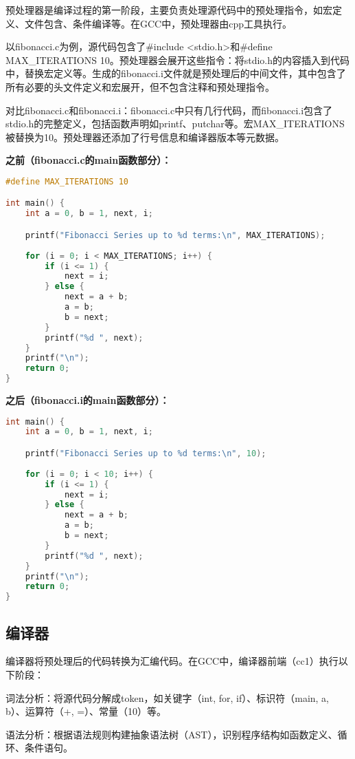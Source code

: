 \documentclass[a4paper]{article}
\begin{document}
预处理器是编译过程的第一阶段，主要负责处理源代码中的预处理指令，如宏定义、文件包含、条件编译等。在GCC中，预处理器由cpp工具执行。

以fibonacci.c为例，源代码包含了\#include <stdio.h>和\#define MAX\_ITERATIONS 10。预处理器会展开这些指令：将stdio.h的内容插入到代码中，替换宏定义等。生成的fibonacci.i文件就是预处理后的中间文件，其中包含了所有必要的头文件定义和宏展开，但不包含注释和预处理指令。

对比fibonacci.c和fibonacci.i：fibonacci.c中只有几行代码，而fibonacci.i包含了stdio.h的完整定义，包括函数声明如printf、putchar等。宏MAX\_ITERATIONS被替换为10。预处理器还添加了行号信息和编译器版本等元数据。

\textbf{之前（fibonacci.c的main函数部分）：}
\begin{lstlisting}[language=C]
#define MAX_ITERATIONS 10

int main() {
    int a = 0, b = 1, next, i;

    printf("Fibonacci Series up to %d terms:\n", MAX_ITERATIONS);
    
    for (i = 0; i < MAX_ITERATIONS; i++) {
        if (i <= 1) {
            next = i;
        } else {
            next = a + b;
            a = b;
            b = next;
        }
        printf("%d ", next);
    }
    printf("\n");
    return 0;
}
\end{lstlisting}

\textbf{之后（fibonacci.i的main函数部分）：}
\begin{lstlisting}[language=C]
int main() {
    int a = 0, b = 1, next, i;

    printf("Fibonacci Series up to %d terms:\n", 10);
    
    for (i = 0; i < 10; i++) {
        if (i <= 1) {
            next = i;
        } else {
            next = a + b;
            a = b;
            b = next;
        }
        printf("%d ", next);
    }
    printf("\n");
    return 0;
}
\end{lstlisting}

\subsection{编译器}

编译器将预处理后的代码转换为汇编代码。在GCC中，编译器前端（cc1）执行以下阶段：

词法分析：将源代码分解成token，如关键字（int, for, if）、标识符（main, a, b）、运算符（+, =）、常量（10）等。

语法分析：根据语法规则构建抽象语法树（AST），识别程序结构如函数定义、循环、条件语句。
\end{document}
